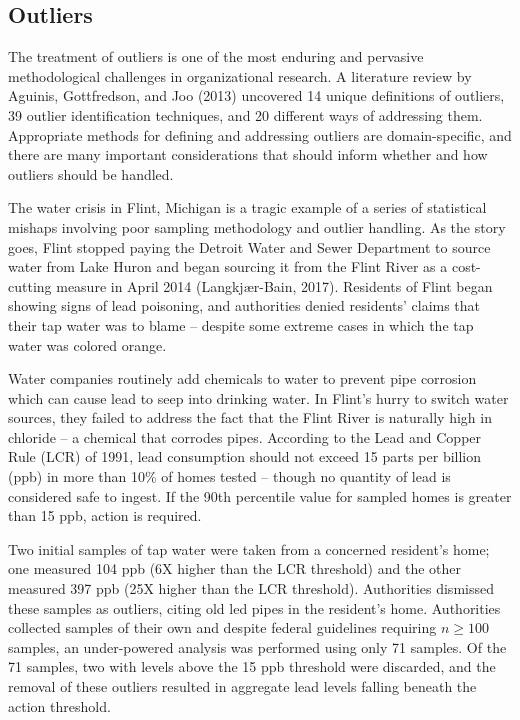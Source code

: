 \documentclass[
]{book}
\begin{document}
\hypertarget{outliers}{%
\subsection{Outliers}\label{outliers}}

The treatment of outliers is one of the most enduring and pervasive methodological challenges in organizational research. A literature review by Aguinis, Gottfredson, and Joo (2013) uncovered 14 unique definitions of outliers, 39 outlier identification techniques, and 20 different ways of addressing them. Appropriate methods for defining and addressing outliers are domain-specific, and there are many important considerations that should inform whether and how outliers should be handled.

The water crisis in Flint, Michigan is a tragic example of a series of statistical mishaps involving poor sampling methodology and outlier handling. As the story goes, Flint stopped paying the Detroit Water and Sewer Department to source water from Lake Huron and began sourcing it from the Flint River as a cost-cutting measure in April 2014 (Langkjær-Bain, 2017). Residents of Flint began showing signs of lead poisoning, and authorities denied residents' claims that their tap water was to blame -- despite some extreme cases in which the tap water was colored orange.

Water companies routinely add chemicals to water to prevent pipe corrosion which can cause lead to seep into drinking water. In Flint's hurry to switch water sources, they failed to address the fact that the Flint River is naturally high in chloride -- a chemical that corrodes pipes. According to the Lead and Copper Rule (LCR) of 1991, lead consumption should not exceed 15 parts per billion (ppb) in more than 10\% of homes tested -- though no quantity of lead is considered safe to ingest. If the 90th percentile value for sampled homes is greater than 15 ppb, action is required.

Two initial samples of tap water were taken from a concerned resident's home; one measured 104 ppb (6X higher than the LCR threshold) and the other measured 397 ppb (25X higher than the LCR threshold). Authorities dismissed these samples as outliers, citing old led pipes in the resident's home. Authorities collected samples of their own and despite federal guidelines requiring \(n \ge 100\) samples, an under-powered analysis was performed using only 71 samples. Of the 71 samples, two with levels above the 15 ppb threshold were discarded, and the removal of these outliers resulted in aggregate lead levels falling beneath the action threshold.
\end{document}
